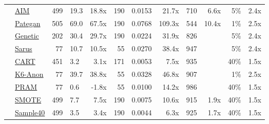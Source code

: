 \begin{table}
\begin{tabular}{llrlr@{\hskip 10pt}r@{\hskip 6pt}l@{\hskip 6pt}r@{\hskip 10pt}r@{\hskip 6pt}r@{\hskip 6pt}r@{\hskip 6pt}r}
        \cellcolor{ForestGreen} & \href{https://htmlpreview.github.io/?https://github.com/yoid2000/sdnist-summary/blob/main/results/aim_e_10_all/report.html}{AIM} & 499 & 19.3 & 18.8x & 190 & 0.0153 & 21.7x & 710 & 6.6x & 5\% & 2.4x \\
        \cellcolor{ForestGreen} & \href{https://htmlpreview.github.io/?https://github.com/yoid2000/sdnist-summary/blob/main/results/pategan_n_iter_50_e_10_all/report.html}{Pategan} & 505 & 69.0 & 67.5x & 190 & 0.0768 & 109.3x & 544 & 10.4x & 1\% & 2.5x \\
        \cellcolor{YellowGreen} & \href{https://htmlpreview.github.io/?https://github.com/yoid2000/sdnist-summary/blob/main/results/genetic_sd_e_10_simple/report.html}{Genetic} & 202 & 30.4 & 29.7x & 190 & 0.0224 & 31.9x & 826 &   & 5\% & 2.4x \\
        \cellcolor{YellowGreen} & \href{https://htmlpreview.github.io/?https://github.com/yoid2000/sdnist-summary/blob/main/results/sarus_sdg_demographic/report.html}{Sarus} & 77 & 10.7 & 10.5x & 55 & 0.0270 & 38.4x & 947 &   & 5\% & 2.4x \\
        \cellcolor{SkyBlue} & \href{https://htmlpreview.github.io/?https://github.com/yoid2000/sdnist-summary/blob/main/results/cart_cf21/report.html}{CART} & 451 & 3.2 & 3.1x & 171 & 0.0053 & 7.5x & 935 &   & 40\% & 1.5x \\
        \cellcolor{pink} & \href{https://htmlpreview.github.io/?https://github.com/yoid2000/sdnist-summary/blob/main/results/k_anonymity_k_6/report.html}{K6-Anon} & 77 & 39.7 & 38.8x & 55 & 0.0328 & 46.8x & 907 &   & 1\% & 2.5x \\
        \cellcolor{Tan} & \href{https://htmlpreview.github.io/?https://github.com/yoid2000/sdnist-summary/blob/main/results/pram_default/report.html}{PRAM} & 77 & 0.6 & -1.8x & 55 & 0.0100 & 14.2x & 986 &   & 40\% & 1.5x \\
        \cellcolor{Sepia} & \href{https://htmlpreview.github.io/?https://github.com/yoid2000/sdnist-summary/blob/main/results/smote_target_marital/report.html}{SMOTE} & 499 & 7.7 & 7.5x & 190 & 0.0075 & 10.6x & 915 & 1.9x & 40\% & 1.5x \\
        \cellcolor{Sepia} & \href{https://htmlpreview.github.io/?https://github.com/yoid2000/sdnist-summary/blob/main/results/subsample_40pcnt_all/report.html}{Sample40} & 499 & 3.5 & 3.4x & 190 & 0.0044 & 6.3x & 925 & 1.7x & 40\% & 1.5x \\
        \bottomrule
    \end{tabular}
\end{table}
